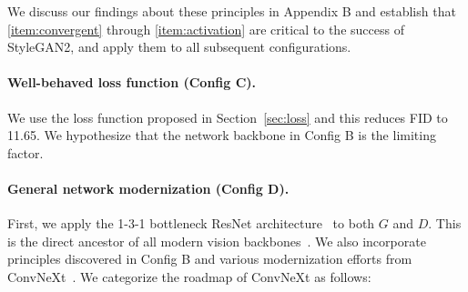 We discuss our findings about these principles in Appendix B and establish that \ref{item:convergent} through \ref{item:activation} are critical to the success of StyleGAN2, and apply them to all subsequent configurations.

\paragraph{Well-behaved loss function (Config C).}
We use the loss function proposed in Section~\ref{sec:loss} and this reduces FID to 11.65. We hypothesize that the network backbone in Config B is the limiting factor. 

\paragraph{General network modernization (Config D).}
First, we apply the 1-3-1 bottleneck ResNet architecture~\cite{resnet,resnet2} to both $G$ and $D$. This is the direct ancestor of all modern vision backbones~\cite{convnext,metaformer}. 
We also incorporate principles discovered in Config B and various modernization efforts from ConvNeXt~\cite{convnext}. We categorize the roadmap of ConvNeXt as follows:

